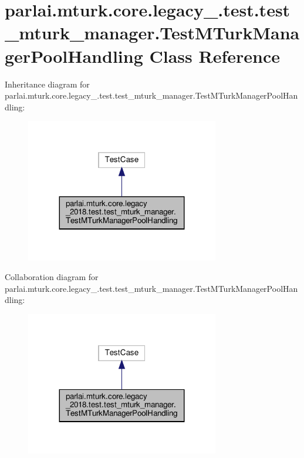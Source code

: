 \hypertarget{classparlai_1_1mturk_1_1core_1_1legacy__2018_1_1test_1_1test__mturk__manager_1_1TestMTurkManagerPoolHandling}{}\section{parlai.\+mturk.\+core.\+legacy\+\_.\+test.\+test\+\_\+mturk\+\_\+manager.\+Test\+M\+Turk\+Manager\+Pool\+Handling Class Reference}
\label{classparlai_1_1mturk_1_1core_1_1legacy__2018_1_1test_1_1test__mturk__manager_1_1TestMTurkManagerPoolHandling}


Inheritance diagram for parlai.\+mturk.\+core.\+legacy\+\_.\+test.\+test\+\_\+mturk\+\_\+manager.\+Test\+M\+Turk\+Manager\+Pool\+Handling\+:\nopagebreak
\begin{figure}[H]
\begin{center}
\leavevmode
\includegraphics[width=239pt]{d1/d41/classparlai_1_1mturk_1_1core_1_1legacy__2018_1_1test_1_1test__mturk__manager_1_1TestMTurkManagerPoolHandling__inherit__graph}
\end{center}
\end{figure}


Collaboration diagram for parlai.\+mturk.\+core.\+legacy\+\_.\+test.\+test\+\_\+mturk\+\_\+manager.\+Test\+M\+Turk\+Manager\+Pool\+Handling\+:\nopagebreak
\begin{figure}[H]
\begin{center}
\leavevmode
\includegraphics[width=239pt]{de/dcb/classparlai_1_1mturk_1_1core_1_1legacy__2018_1_1test_1_1test__mturk__manager_1_1TestMTurkManagerPoolHandling__coll__graph}
\end{center}
\end{figure}

